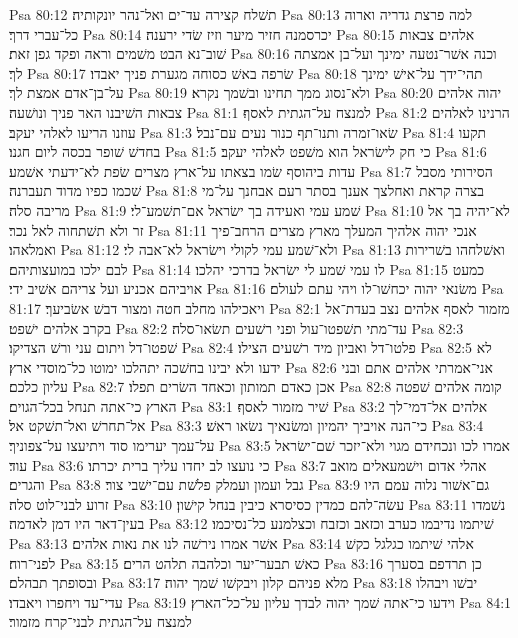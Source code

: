 Psa 80:12  תשׁלח קצירה עד־ים ואל־נהר יונקותיה׃
Psa 80:13  למה פרצת גדריה וארוה כל־עברי דרך׃
Psa 80:14  יכרסמנה חזיר מיער וזיז שׂדי ירענה׃
Psa 80:15  אלהים צבאות שׁוב־נא הבט משׁמים וראה ופקד גפן זאת׃
Psa 80:16  וכנה אשׁר־נטעה ימינך ועל־בן אמצתה לך׃
Psa 80:17  שׂרפה באשׁ כסוחה מגערת פניך יאבדו׃
Psa 80:18  תהי־ידך על־אישׁ ימינך על־בן־אדם אמצת לך׃
Psa 80:19  ולא־נסוג ממך תחינו ובשׁמך נקרא׃
Psa 80:20  יהוה אלהים צבאות השׁיבנו האר פניך ונושׁעה׃
Psa 81:1  למנצח על־הגתית לאסף׃
Psa 81:2  הרנינו לאלהים עוזנו הריעו לאלהי יעקב׃
Psa 81:3  שׂאו־זמרה ותנו־תף כנור נעים עם־נבל׃
Psa 81:4  תקעו בחדשׁ שׁופר בכסה ליום חגנו׃
Psa 81:5  כי חק לישׂראל הוא משׁפט לאלהי יעקב׃
Psa 81:6  עדות ביהוסף שׂמו בצאתו על־ארץ מצרים שׂפת לא־ידעתי אשׁמע׃
Psa 81:7  הסירותי מסבל שׁכמו כפיו מדוד תעברנה׃
Psa 81:8  בצרה קראת ואחלצך אענך בסתר רעם אבחנך על־מי מריבה סלה׃
Psa 81:9  שׁמע עמי ואעידה בך ישׂראל אם־תשׁמע־לי׃
Psa 81:10  לא־יהיה בך אל זר ולא תשׁתחוה לאל נכר׃
Psa 81:11  אנכי יהוה אלהיך המעלך מארץ מצרים הרחב־פיך ואמלאהו׃
Psa 81:12  ולא־שׁמע עמי לקולי וישׂראל לא־אבה לי׃
Psa 81:13  ואשׁלחהו בשׁרירות לבם ילכו במועצותיהם׃
Psa 81:14  לו עמי שׁמע לי ישׂראל בדרכי יהלכו׃
Psa 81:15  כמעט אויביהם אכניע ועל צריהם אשׁיב ידי׃
Psa 81:16  משׂנאי יהוה יכחשׁו־לו ויהי עתם לעולם׃
Psa 81:17  ויאכילהו מחלב חטה ומצור דבשׁ אשׂביעך׃
Psa 82:1  מזמור לאסף אלהים נצב בעדת־אל בקרב אלהים ישׁפט׃
Psa 82:2  עד־מתי תשׁפטו־עול ופני רשׁעים תשׂאו־סלה׃
Psa 82:3  שׁפטו־דל ויתום עני ורשׁ הצדיקו׃
Psa 82:4  פלטו־דל ואביון מיד רשׁעים הצילו׃
Psa 82:5  לא ידעו ולא יבינו בחשׁכה יתהלכו ימוטו כל־מוסדי ארץ׃
Psa 82:6  אני־אמרתי אלהים אתם ובני עליון כלכם׃
Psa 82:7  אכן כאדם תמותון וכאחד השׂרים תפלו׃
Psa 82:8  קומה אלהים שׁפטה הארץ כי־אתה תנחל בכל־הגוים׃
Psa 83:1  שׁיר מזמור לאסף׃
Psa 83:2  אלהים אל־דמי־לך אל־תחרשׁ ואל־תשׁקט אל׃
Psa 83:3  כי־הנה אויביך יהמיון ומשׂנאיך נשׂאו ראשׁ׃
Psa 83:4  על־עמך יערימו סוד ויתיעצו על־צפוניך׃
Psa 83:5  אמרו לכו ונכחידם מגוי ולא־יזכר שׁם־ישׂראל עוד׃
Psa 83:6  כי נועצו לב יחדו עליך ברית יכרתו׃
Psa 83:7  אהלי אדום וישׁמעאלים מואב והגרים׃
Psa 83:8  גבל ועמון ועמלק פלשׁת עם־ישׁבי צור׃
Psa 83:9  גם־אשׁור נלוה עמם היו זרוע לבני־לוט סלה׃
Psa 83:10  עשׂה־להם כמדין כסיסרא כיבין בנחל קישׁון׃
Psa 83:11  נשׁמדו בעין־דאר היו דמן לאדמה׃
Psa 83:12  שׁיתמו נדיבמו כערב וכזאב וכזבח וכצלמנע כל־נסיכמו׃
Psa 83:13  אשׁר אמרו נירשׁה לנו את נאות אלהים׃
Psa 83:14  אלהי שׁיתמו כגלגל כקשׁ לפני־רוח׃
Psa 83:15  כאשׁ תבער־יער וכלהבה תלהט הרים׃
Psa 83:16  כן תרדפם בסערך ובסופתך תבהלם׃
Psa 83:17  מלא פניהם קלון ויבקשׁו שׁמך יהוה׃
Psa 83:18  יבשׁו ויבהלו עדי־עד ויחפרו ויאבדו׃
Psa 83:19  וידעו כי־אתה שׁמך יהוה לבדך עליון על־כל־הארץ׃
Psa 84:1  למנצח על־הגתית לבני־קרח מזמור׃
